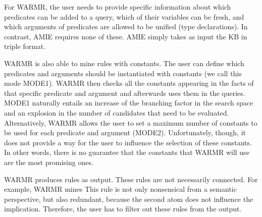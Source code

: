 
For WARMR, 
the user needs to provide 
specific information about which predicates can be added to a query, which of their variables can be fresh, and which arguments of predicates are allowed to be unified (type declarations). In contrast, AMIE requires none of these. 
AMIE simply takes as input the KB in triple format.

WARMR is also able to mine rules with constants. The user can define which predicates and arguments should be instantiated with constants (we call this mode MODE1). WARMR then checks all the constants appearing in the facts of that specific predicate and argument and afterwards uses them in the queries. 
MODE1 naturally entails an increase of the branching factor in the search space and an explosion in the number of candidates that need to be evaluated. Alternatively, WARMR allows the user to set a maximum number of constants to be used for each predicate and argument (MODE2). Unfortunately, though, it does not provide a way for the user to influence the selection of these constants. In other words, there is no guarantee that the constants that WARMR will use are the most promising ones. 

WARMR produces rules as output. These rules are not necessarily connected. For example, WARMR mines
This rule is not only nonsensical from a semantic perspective, but also redundant, because the second atom does not influence the implication. Therefore, the user has to filter out these rules from the output.

